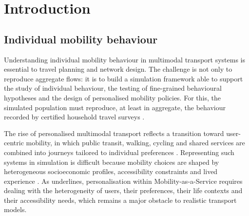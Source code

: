 
\section{Introduction}
\label{sec:intro}

\subsection{Individual mobility behaviour}

Understanding individual mobility behaviour in multimodal transport systems is essential to travel planning and network design. The challenge is not only to reproduce aggregate flows: it is to build a simulation framework able to support the study of individual behaviour, the testing of fine-grained behavioural hypotheses and the design of personalised mobility policies. For this, the simulated population must reproduce, at least in aggregate, the behaviour recorded by certified household travel surveys \citep{tisseo2023emc2}.

The rise of personalised multimodal transport reflects a transition toward user-centric mobility, in which public transit, walking, cycling and shared services are combined into journeys tailored to individual preferences \citep{smith1995transims,horni2016matsim}. Representing such systems in simulation is difficult because mobility choices are shaped by heterogeneous socioeconomic profiles, accessibility constraints and lived experience \citep{grignard2018impact}. As \citet{oberoi2024personalisation} underlines, personalisation within Mobility-as-a-Service requires dealing with the heterogeneity of users, their preferences, their life contexts and their accessibility needs, which remains a major obstacle to realistic transport models.

